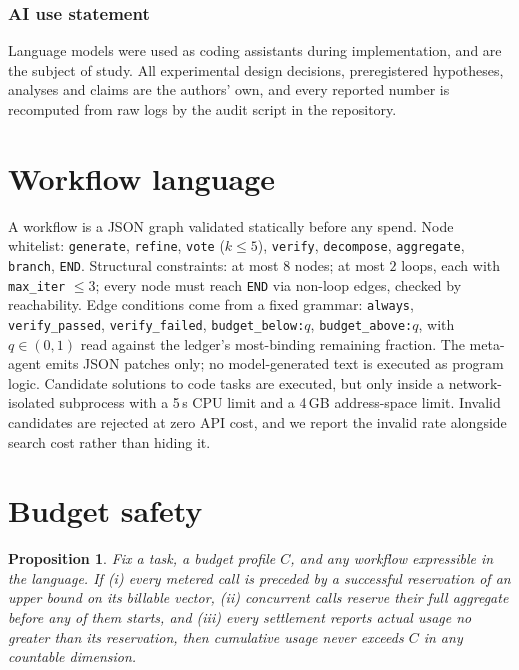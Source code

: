 \documentclass{article}
\newtheorem{proposition}{Proposition}
\begin{document}
\subsubsection*{AI use statement}

Language models were used as coding assistants during implementation, and are the
subject of study. All experimental design decisions, preregistered hypotheses,
analyses and claims are the authors' own, and every reported number is recomputed
from raw logs by the audit script in the repository.




\appendix
\section{Workflow language}
\label{app:dsl}

A workflow is a JSON graph validated statically before any spend. Node
whitelist: \texttt{generate}, \texttt{refine}, \texttt{vote} ($k\le 5$),
\texttt{verify}, \texttt{decompose}, \texttt{aggregate}, \texttt{branch},
\texttt{END}. Structural constraints: at most $8$ nodes; at most $2$ loops, each
with \texttt{max\_iter} $\le 3$; every node must reach \texttt{END} via non-loop
edges, checked by reachability. Edge conditions come from a fixed grammar:
\texttt{always}, \texttt{verify\_passed}, \texttt{verify\_failed},
\texttt{budget\_below:$q$}, \texttt{budget\_above:$q$}, with $q\in(0,1)$ read
against the ledger's most-binding remaining fraction. The meta-agent emits JSON
patches only; no model-generated text is executed as program logic. Candidate
solutions to code tasks are executed, but only inside a network-isolated
subprocess with a 5\,s CPU limit and a 4\,GB address-space limit. Invalid
candidates are rejected at zero API cost, and we report the invalid rate
alongside search cost rather than hiding it.

\section{Budget safety}
\label{app:safety}

\begin{proposition}
Fix a task, a budget profile $C$, and any workflow expressible in the language.
If (i) every metered call is preceded by a successful reservation of an upper
bound on its billable vector, (ii) concurrent calls reserve their full aggregate
before any of them starts, and (iii) every settlement reports actual usage no
greater than its reservation, then cumulative usage never exceeds $C$ in any
countable dimension.
\end{proposition}
\end{document}
